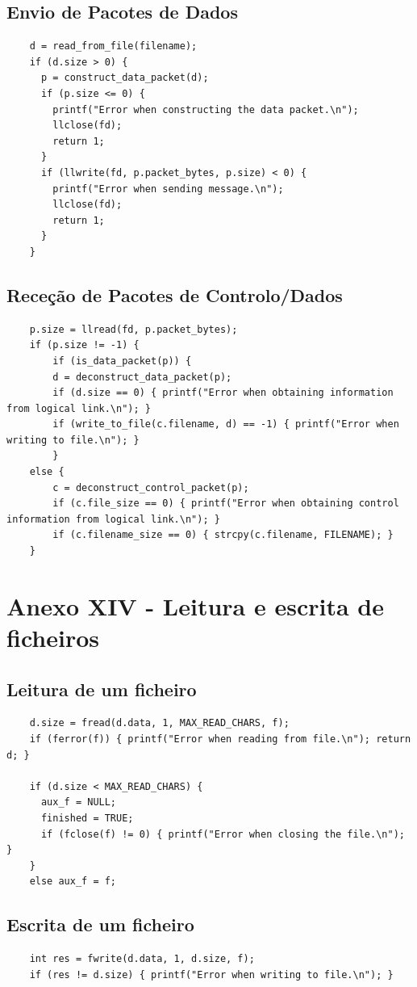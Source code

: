 \documentclass[article, a4paper, 11pt, oneside]{memoir}
\begin{document}
\subsection{Envio de Pacotes de Dados}
\begin{lstlisting}
    d = read_from_file(filename);
    if (d.size > 0) {
      p = construct_data_packet(d);
      if (p.size <= 0) {
        printf("Error when constructing the data packet.\n");
        llclose(fd);
        return 1;
      }
      if (llwrite(fd, p.packet_bytes, p.size) < 0) {
        printf("Error when sending message.\n");
        llclose(fd);
        return 1;
      }
    }
\end{lstlisting}

\subsection{Receção de Pacotes de Controlo/Dados}
\begin{lstlisting}
    p.size = llread(fd, p.packet_bytes);
    if (p.size != -1) {
        if (is_data_packet(p)) {
        d = deconstruct_data_packet(p);
        if (d.size == 0) { printf("Error when obtaining information from logical link.\n"); }
        if (write_to_file(c.filename, d) == -1) { printf("Error when writing to file.\n"); }
        }
    else {
        c = deconstruct_control_packet(p);
        if (c.file_size == 0) { printf("Error when obtaining control information from logical link.\n"); }
        if (c.filename_size == 0) { strcpy(c.filename, FILENAME); }
    }
\end{lstlisting}

\section{Anexo XIV - Leitura e escrita de ficheiros}
\subsection{Leitura de um ficheiro}
\begin{lstlisting}
    d.size = fread(d.data, 1, MAX_READ_CHARS, f);
    if (ferror(f)) { printf("Error when reading from file.\n"); return d; }
  
    if (d.size < MAX_READ_CHARS) {
      aux_f = NULL;
      finished = TRUE;
      if (fclose(f) != 0) { printf("Error when closing the file.\n"); }
    }
    else aux_f = f;
\end{lstlisting}

\subsection{Escrita de um ficheiro}
\begin{lstlisting}
    int res = fwrite(d.data, 1, d.size, f);
    if (res != d.size) { printf("Error when writing to file.\n"); }
\end{lstlisting}
\end{document}
